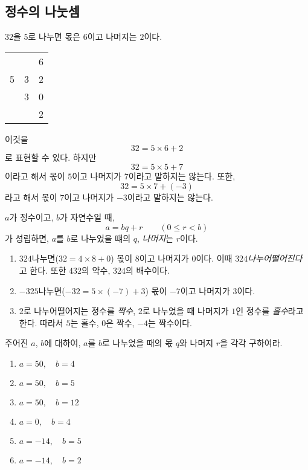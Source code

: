 \documentclass{oblivoir}
\begin{document}
%
\subsection{정수의 나눗셈}

\exam{}
\(32\)을 \(5\)로 나누면 몫은 \(6\)이고 나머지는 \(2\)이다.
\begin{table}[h!]
\centering
\begin{tabular}{cc@{}c}
&&6\\
\cline{2-3}
5	&\multicolumn{1}{|c}{3}	&2\\
	&3							&0\\
\hline
	&							&2
\end{tabular}
\end{table}

이것을 \[32=5\times6+2\]로 표현할 수 있다.
하지만
\[32=5\times5+7\]
이라고 해서 몫이 \(5\)이고 나머지가 \(7\)이라고 말하지는 않는다.
또한,
\[32=5\times7+(-3)\]
라고 해서 몫이 \(7\)이고 나머지가 \(-3\)이라고 말하지는 않는다.

\begin{mdframed}
%
\(a\)가 정수이고, \(b\)가 자연수일 때,
\[a=bq+r\qquad(0\le r<b)\]
가 성립하면, \(a\)를 \(b\)로 나누었을 떄의  \(q\), \emph{나머지}는 \(r\)이다.
\end{mdframed}

\clearpage
%
\exam{}
\begin{enumerate}
\item
\(32\)\를 \(4\) 나누면(\(32=4\times8+0\)) 몫이 \(8\)이고 나머지가 \(0\)이다.
이때 \(32\)\은 \(4\) \emph{나누어떨어진다}고 한다.
또한 \(4\)\는 \(32\)의 약수, \(32\)\은 \(4\)의 배수이다.
\item
\(-32\)\은 \(5\)\로 나누면(\(-32=5\times(-7)+3\)) 몫이 \(-7\)이고 나머지가 \(3\)이다.
\item
\(2\)로 나누어떨어지는 정수를 \emph{짝수}, \(2\)로 나누었을 때 나머지가 \(1\)인 정수를 \emph{홀수}라고 한다.
따라서 \(5\)는 홀수, \(0\)은 짝수, \(-4\)는 짝수이다.
\end{enumerate}

%
\prob{}\label{div1}
주어진 \(a\), \(b\)에 대하여, \(a\)를 \(b\)로 나누었을 때의 몫 \(q\)와 나머지 \(r\)을 각각 구하여라.\begin{enumerate}
\item
\(a=50,\quad b=4\)
\item
\(a=50,\quad b=5\)
\item
\(a=50,\quad b=12\)
\item
\(a=0,\quad b=4\)
\item
\(a=-14,\quad b=5\)
\item
\(a=-14,\quad b=2\)
\end{enumerate}
\end{document}
